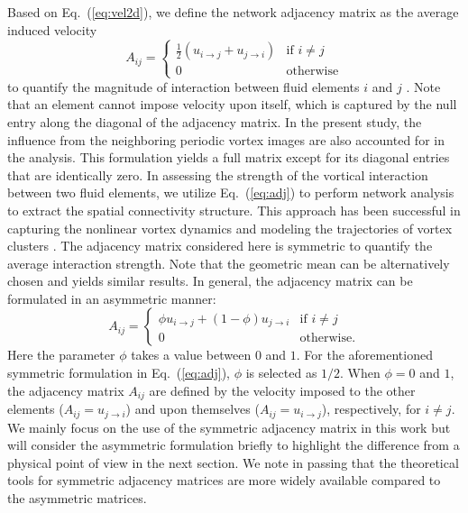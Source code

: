 \documentclass{jfm}
\begin{document}
Based on Eq.~(\ref{eq:vel2d}), we define the network adjacency matrix as the average induced velocity
\begin{equation}
   A_{ij} = 
   \begin{cases} \frac{1}{2} ( u_{i \rightarrow j} + u_{j \rightarrow i}) & 
   \text{if~} i\ne j \\ 0 & \text{otherwise}
   \end{cases}
   \label{eq:adj}
\end{equation}
to quantify the magnitude of interaction between fluid elements $i$ and $j$ \citep{Nair:JFM15}.  Note that an element cannot impose velocity upon itself, which is captured by the null entry along the diagonal of the adjacency matrix.  In the present study, the influence from the neighboring periodic vortex images are also accounted for in the analysis.  This formulation yields a full matrix except for its diagonal entries that are identically zero.  In assessing the strength of the vortical interaction between two fluid elements, we utilize Eq.~(\ref{eq:adj}) to perform network analysis to extract the spatial connectivity structure.  This approach has been successful in capturing the nonlinear vortex dynamics and modeling the trajectories of vortex clusters \citep{Nair:JFM15}.  The adjacency matrix considered here is symmetric to quantify the average interaction strength.  Note that the geometric mean can be alternatively chosen and yields similar results.  In general, the adjacency matrix can be formulated in an asymmetric manner:
\begin{equation}
   A_{ij} = \begin{cases} \phi  u_{i \rightarrow j} + (1-\phi) u_{j \rightarrow i} & \text{if~} i\ne j \\ 0 & \text{otherwise}. \end{cases}
   \label{eq:adj_asymmetric}
\end{equation}
Here the parameter $\phi$ takes a value between $0$ and $1$.  For the aforementioned symmetric formulation in Eq.~(\ref{eq:adj}), $\phi$ is selected as $1/2$.  When $\phi = 0$ and $1$, the adjacency matrix $A_{ij}$ are defined by the velocity imposed to the other elements ($A_{ij} = u_{j \rightarrow i}$) and upon themselves ($A_{ij} = u_{i \rightarrow j}$), respectively, for $i\ne j$.  We mainly focus on the use of the symmetric adjacency matrix in this work but will consider the asymmetric formulation briefly to highlight the difference from a physical point of view in the next section.  We note in passing that the theoretical tools for symmetric adjacency matrices are more widely available compared to the asymmetric matrices.
\end{document}
